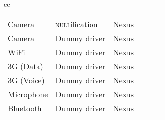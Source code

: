 \begin{figure*}[t!]
\begin{tabular}{cc}
\begin{minipage}{0.62\textwidth}
\begin{tabular}{|p{0.78in}|p{0.75in}|p{0.35in}|p{0.5in}|p{0.45in}|p{0.55in}|}
Camera       & \textsc{null}ification  & Nexus  & \centcol{140} & \centcol{-}    & \centcol{332}\\
Camera       & Dummy driver            & Nexus  & \centcol{224} & \centcol{2.19} & \centcol{500}\\
WiFi         & Dummy driver            & Nexus  & \centcol{152} & \centcol{5.58} & \centcol{356}\\
3G (Data)    & Dummy driver            & Nexus  & \centcol{192} & \centcol{2.15} & \centcol{436}\\
3G (Voice)   & Dummy driver            & Nexus  & \centcol{124} & \centcol{2.15} & \centcol{300}\\
Microphone   & Dummy driver            & Nexus  & \centcol{164} & \centcol{2.27} & \centcol{380}\\
Bluetooth    & Dummy driver            & Nexus  & \centcol{32}  & \centcol{2.52} & \centcol{116}\\
\hline
\end{tabular}
\end{minipage}
\end{tabular}
\end{figure*}



